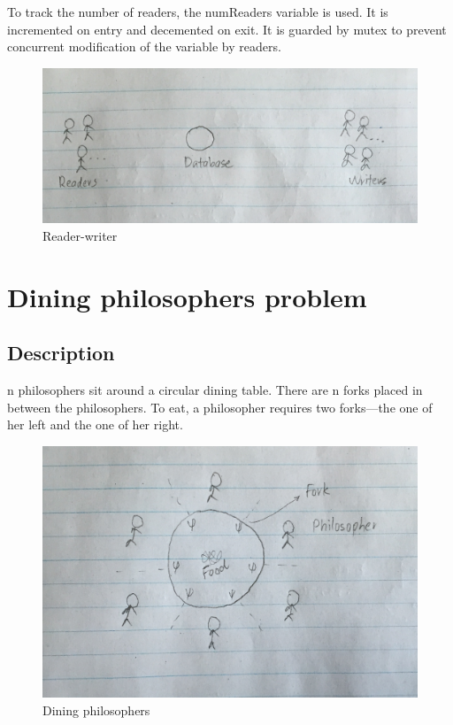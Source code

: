 \documentclass[twoside]{article}
\begin{document}
To track the number of readers, the numReaders variable is used. It is incremented on entry and decemented on exit. It is guarded by mutex to prevent concurrent modification of the variable by readers.

\begin{figure}
  \includegraphics[width=\linewidth]{img/rw.png}
  \caption{Reader-writer}
\end{figure}

\section{Dining philosophers problem}

\subsection{Description}

n philosophers sit around a circular dining table.  There are n forks placed in between the philosophers. To eat, a philosopher requires two forks---the one of her left and the one of her right.

\begin{figure}
  \includegraphics[width=\linewidth]{img/phil.png}
  \caption{Dining philosophers}
\end{figure}
\end{document}
